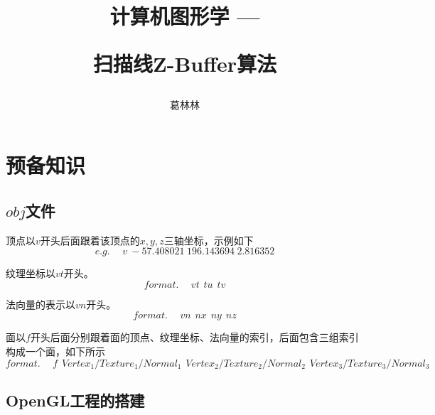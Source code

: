 \documentclass[10pt]{article}
\title{计算机图形学 \hspace{2pt}—\hspace{2pt} \begin{large}扫描线Z-Buffer算法 \end{large} }
\author{葛林林}
\begin{document}
\maketitle


\section{预备知识}
\subsection{$obj$文件}
顶点以$v$开头后面跟着该顶点的$x,y,z$三轴坐标，示例如下
$$e.g. \hspace{15pt} v\hspace{3pt} -57.408021\hspace{3pt}196.143694\hspace{3pt}2.816352$$

纹理坐标以$vt$开头。
$$format.\hspace{15pt} vt \hspace{5pt}tu \hspace{5pt} tv$$

法向量的表示以$vn$开头。
$$format.\hspace{15pt} vn \hspace{5pt} nx\hspace{5pt} ny \hspace{5pt} nz$$

面以$f$开头后面分别跟着面的顶点、纹理坐标、法向量的索引，后面包含三组索引构成一个面，如下所示
$$format.\hspace{15pt} f \hspace{5pt} Vertex_1/Texture_1/Normal_1 \hspace{5pt} Vertex_2/Texture_2/Normal_2 \hspace{5pt} Vertex_3/Texture_3/Normal_3$$
\subsection{OpenGL工程的搭建}
\end{document}
